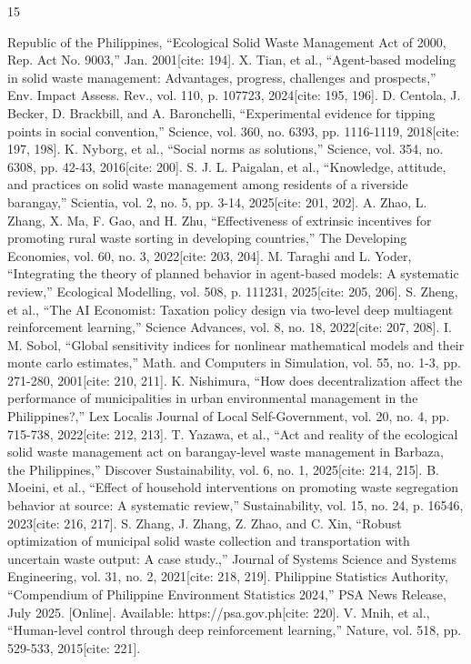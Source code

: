 \documentclass[conference]{IEEEtran}
\begin{document}
\begin{thebibliography}{15}

 Republic of the Philippines, ``Ecological Solid Waste Management Act of 2000, Rep. Act No. 9003,'' Jan. 2001[cite: 194].
 X. Tian, et al., ``Agent-based modeling in solid waste management: Advantages, progress, challenges and prospects,'' Env. Impact Assess. Rev., vol. 110, p. 107723, 2024[cite: 195, 196].
 D. Centola, J. Becker, D. Brackbill, and A. Baronchelli, ``Experimental evidence for tipping points in social convention,'' Science, vol. 360, no. 6393, pp. 1116-1119, 2018[cite: 197, 198].
 K. Nyborg, et al., ``Social norms as solutions,'' Science, vol. 354, no. 6308, pp. 42-43, 2016[cite: 200].
 S. J. L. Paigalan, et al., ``Knowledge, attitude, and practices on solid waste management among residents of a riverside barangay,'' Scientia, vol. 2, no. 5, pp. 3-14, 2025[cite: 201, 202].
 A. Zhao, L. Zhang, X. Ma, F. Gao, and H. Zhu, ``Effectiveness of extrinsic incentives for promoting rural waste sorting in developing countries,'' The Developing Economies, vol. 60, no. 3, 2022[cite: 203, 204].
 M. Taraghi and L. Yoder, ``Integrating the theory of planned behavior in agent-based models: A systematic review,'' Ecological Modelling, vol. 508, p. 111231, 2025[cite: 205, 206].
 S. Zheng, et al., ``The AI Economist: Taxation policy design via two-level deep multiagent reinforcement learning,'' Science Advances, vol. 8, no. 18, 2022[cite: 207, 208].
 I. M. Sobol, ``Global sensitivity indices for nonlinear mathematical models and their monte carlo estimates,'' Math. and Computers in Simulation, vol. 55, no. 1-3, pp. 271-280, 2001[cite: 210, 211].
 K. Nishimura, ``How does decentralization affect the performance of municipalities in urban environmental management in the Philippines?,'' Lex Localis Journal of Local Self-Government, vol. 20, no. 4, pp. 715-738, 2022[cite: 212, 213].
 T. Yazawa, et al., ``Act and reality of the ecological solid waste management act on barangay-level waste management in Barbaza, the Philippines,'' Discover Sustainability, vol. 6, no. 1, 2025[cite: 214, 215].
 B. Moeini, et al., ``Effect of household interventions on promoting waste segregation behavior at source: A systematic review,'' Sustainability, vol. 15, no. 24, p. 16546, 2023[cite: 216, 217].
 S. Zhang, J. Zhang, Z. Zhao, and C. Xin, ``Robust optimization of municipal solid waste collection and transportation with uncertain waste output: A case study.,'' Journal of Systems Science and Systems Engineering, vol. 31, no. 2, 2021[cite: 218, 219].
 Philippine Statistics Authority, ``Compendium of Philippine Environment Statistics 2024,'' PSA News Release, July 2025. [Online]. Available: https://psa.gov.ph[cite: 220].
 V. Mnih, et al., ``Human-level control through deep reinforcement learning,'' Nature, vol. 518, pp. 529-533, 2015[cite: 221].

\end{thebibliography}
\end{document}
